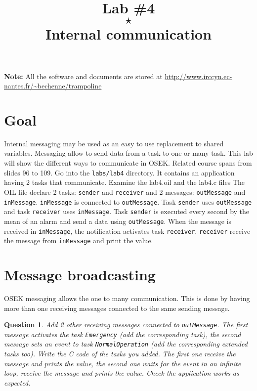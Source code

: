 \documentclass[11pt]{article}
\title{Lab \#4\\$\star$\\Internal communication}
\author{}
\newtheorem{ex}{Question}
\begin{document}
\maketitle

{\bf Note:} All the software and documents are stored at \url{http://www.irccyn.ec-nantes.fr/~bechenne/trampoline}

\section{Goal}

Internal messaging may be used as an easy to use replacement to shared variables. Messaging allow to send data from a task to one or many task. This lab will show the different ways to communicate in OSEK.
Related course spans from slides 96 to 109.
Go into the \texttt{labs/lab4} directory. It contains an application having 2 tasks that communicate.
Examine the lab4.oil and the lab4.c files
The OIL file declare 2 tasks: \texttt{sender} and \texttt{receiver} and 2 messages: \texttt{outMessage} and \texttt{inMessage}. \texttt{inMessage} is connected to \texttt{outMessage}. Task \texttt{sender} uses \texttt{outMessage} and task \texttt{receiver} uses \texttt{inMessage}.
Task \texttt{sender} is executed every second by the mean of an alarm and send a data using \texttt{outMessage}. When the message is received in \texttt{inMessage}, the notification activates task \texttt{receiver}. \texttt{receiver} receive the message from \texttt{inMessage} and print the value.

\section{Message broadcasting}

OSEK messaging allows the one to many communication. This is done by having more than one receiving messages connected to the same sending message.
\begin{ex}
Add 2 other receiving messages connected to \texttt{outMessage}. The first message activates the task \texttt{Emergency} (add the corresponding task), the second message sets an event to task \texttt{NormalOperation} (add the corresponding extended tasks too). Write the C code of the tasks you added. The first one receive the message and prints the value, the second one waits for the event in an infinite loop, receive the message and prints the value. Check the application works as expected.
\end{ex}
\end{document}
